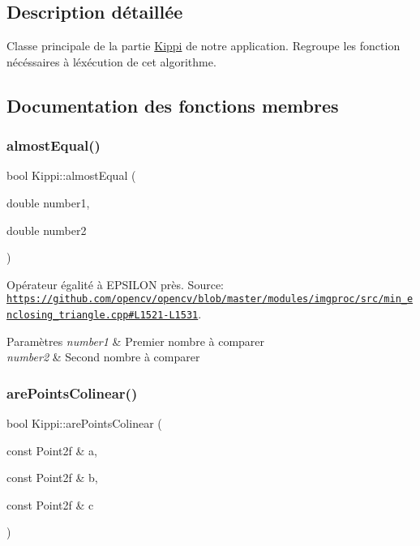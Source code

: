 \subsection{Description détaillée}
Classe principale de la partie \hyperlink{classKippi}{Kippi} de notre application. Regroupe les fonction nécéssaires à l\textquotesingle{}éxécution de cet algorithme. 

\subsection{Documentation des fonctions membres}
\mbox{\label{classKippi_a6631ea0c01edea1b06f87b27f79c667a}} 
\subsubsection{\texorpdfstring{almost\+Equal()}{almostEqual()}}
{\footnotesize\ttfamily bool Kippi\+::almost\+Equal (\begin{DoxyParamCaption}\item[{double}]{number1,  }\item[{double}]{number2 }\end{DoxyParamCaption})\hspace{0.3cm}{\ttfamily [private]}}



Opérateur égalité à E\+P\+S\+I\+L\+ON près. Source\+: \href{https://github.com/opencv/opencv/blob/master/modules/imgproc/src/min_enclosing_triangle.cpp#L1521-L1531}{\tt https\+://github.\+com/opencv/opencv/blob/master/modules/imgproc/src/min\+\_\+enclosing\+\_\+triangle.\+cpp\#\+L1521-\/\+L1531}. 


\begin{DoxyParams}{Paramètres}
{\em number1} & Premier nombre à comparer \\
\hline
{\em number2} & Second nombre à comparer \\
\hline
\end{DoxyParams}
\mbox{\label{classKippi_aa0e06b53305f73af6cd8be09bad0c647}} 
\subsubsection{\texorpdfstring{are\+Points\+Colinear()}{arePointsColinear()}}
{\footnotesize\ttfamily bool Kippi\+::are\+Points\+Colinear (\begin{DoxyParamCaption}\item[{const Point2f \&}]{a,  }\item[{const Point2f \&}]{b,  }\item[{const Point2f \&}]{c }\end{DoxyParamCaption})\hspace{0.3cm}{\ttfamily [private]}}



